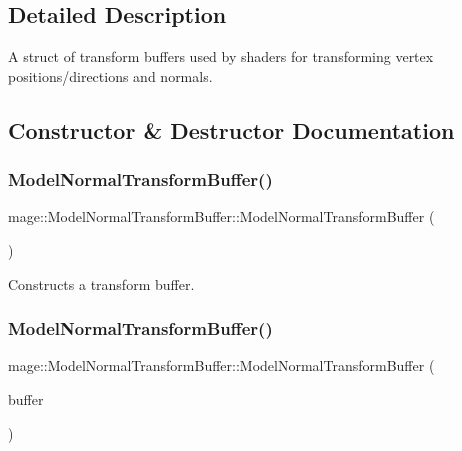 \subsection{Detailed Description}
A struct of transform buffers used by shaders for transforming vertex positions/directions and normals. 

\subsection{Constructor \& Destructor Documentation}
\hypertarget{structmage_1_1_model_normal_transform_buffer_a0ab367c167f3056d32ad06299d9953d0}{}\label{structmage_1_1_model_normal_transform_buffer_a0ab367c167f3056d32ad06299d9953d0} 
\subsubsection{\texorpdfstring{Model\+Normal\+Transform\+Buffer()}{ModelNormalTransformBuffer()}\hspace{0.1cm}{\footnotesize\ttfamily [1/3]}}
{\footnotesize\ttfamily mage\+::\+Model\+Normal\+Transform\+Buffer\+::\+Model\+Normal\+Transform\+Buffer (\begin{DoxyParamCaption}{ }\end{DoxyParamCaption})}

Constructs a transform buffer. \hypertarget{structmage_1_1_model_normal_transform_buffer_a2718abe76ffc0d6cd278aad9d4020429}{}\label{structmage_1_1_model_normal_transform_buffer_a2718abe76ffc0d6cd278aad9d4020429} 
\subsubsection{\texorpdfstring{Model\+Normal\+Transform\+Buffer()}{ModelNormalTransformBuffer()}\hspace{0.1cm}{\footnotesize\ttfamily [2/3]}}
{\footnotesize\ttfamily mage\+::\+Model\+Normal\+Transform\+Buffer\+::\+Model\+Normal\+Transform\+Buffer (\begin{DoxyParamCaption}\item[{const \hyperlink{structmage_1_1_model_normal_transform_buffer}{Model\+Normal\+Transform\+Buffer} \&}]{buffer }\end{DoxyParamCaption})\hspace{0.3cm}{\ttfamily [default]}}

